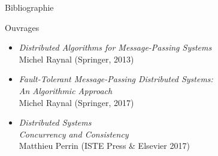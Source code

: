 
\begingroup

\begin{frame}{Bibliographie}

  \begin{block}{Ouvrages}
    \begin{itemize}
    \item
      \textit{Distributed Algorithms for Message-Passing Systems}\\
      Michel Raynal (Springer, 2013)
    \item
      \textit{Fault-Tolerant Message-Passing Distributed Systems: \\ An Algorithmic Approach}\\
      Michel Raynal (Springer, 2017)
    \item
      \textit{Distributed Systems}\\
      \textit{Concurrency and Consistency}\\
      Matthieu Perrin (ISTE Press \& Elsevier 2017)
    \end{itemize}
  \end{block}
  
  
\end{frame}

\endgroup
\endinput
